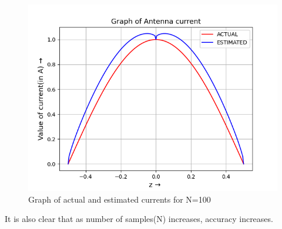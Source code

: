 \documentclass{article}
\begin{document}
\begin{figure}[h!]
\centering
\includegraphics[scale=0.6]{Endsem_2.png}
\caption{Graph of actual and estimated currents for N=100}
\label{fig:universe}
\end{figure}
It is also clear that as number of samples(N) increases, accuracy increases.
\end{document}
